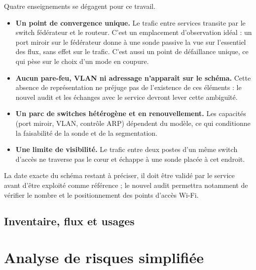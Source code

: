 Quatre enseignements se dégagent pour ce travail.
\begin{itemize}
\item \textbf{Un point de convergence unique.} Le trafic entre services transite par le switch fédérateur et le routeur. C'est un emplacement d'observation idéal : un port miroir sur le fédérateur donne à une sonde passive la vue sur l'essentiel des flux, sans effet sur le trafic. C'est aussi un point de défaillance unique, ce qui pèse sur le choix d'un mode en coupure.
\item \textbf{Aucun pare-feu, VLAN ni adressage n'apparaît sur le schéma.} Cette absence de représentation ne préjuge pas de l'existence de ces éléments : le nouvel audit et les échanges avec le service devront lever cette ambiguïté.
\item \textbf{Un parc de switches hétérogène et en renouvellement.} Les capacités (port miroir, VLAN, contrôle ARP) dépendent du modèle, ce qui conditionne la faisabilité de la sonde et de la segmentation. 
\item \textbf{Une limite de visibilité.} Le trafic entre deux postes d'un même switch d'accès ne traverse pas le cœur et échappe à une sonde placée à cet endroit.
\end{itemize}
La date exacte du schéma restant à préciser, il doit être validé par le service avant d'être exploité comme référence ; le nouvel audit permettra notamment de vérifier le nombre et le positionnement des points d'accès Wi-Fi.

\subsection{Inventaire, flux et usages}



\section{Analyse de risques simplifiée}

